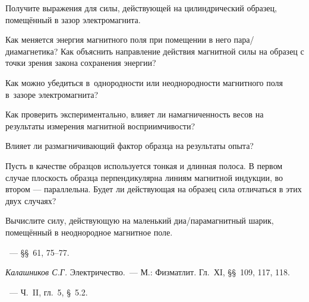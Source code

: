 \begin{lab:questions}
	\item Получите выражения для силы, действующей на цилиндрический образец,
помещённый в зазор электромагнита.
    \item Как меняется энергия магнитного поля при помещении в него
пара/диамагнетика? Как объяснить направление действия магнитной силы
на образец с точки зрения закона сохранения энергии?
    \item Как можно убедиться в~однородности или неоднородности магнитного поля
в~зазоре электромагнита?
	\item Как проверить экспериментально, влияет ли намагниченность весов на
результаты измерения магнитной восприимчивости?
    \item Влияет ли размагничивающий фактор образца на результаты опыта?
	\item Пусть в качестве образцов используется тонкая и длинная полоса.
    В первом случае плоскость образца перпендикулярна линиям магнитной индукции,
    во втором --- параллельна. Будет ли действующая на образец сила
    отличаться в этих двух случаях?
    \item Вычислите силу, действующую на маленький диа/парамагнитный шарик,
    помещённый в неоднородное магнитное поле.
\end{lab:questions}


\begin{lab:literature}
	\item \SivuhinIII~--- \S\S~61, 75--77.
	\item \textit{Калашников С.Г.} Электричество.~--- М.: Физматлит. Гл.~ХI,
\S\S~109, 117, 118.
	\item \KingLokOlh~--- Ч.~II, гл.~5, \S~5.2.
\end{lab:literature}

